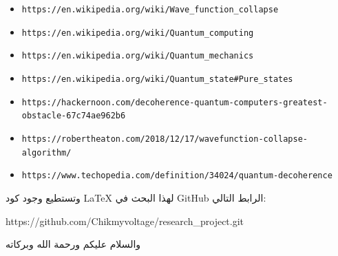 \documentclass[a4paper,12pt,openright,twoside]{book}
\begin{document}
\vspace*{0.5in}
\begin{itemize}
		\scriptsize
	\item \verb|https://en.wikipedia.org/wiki/Wave_function_collapse|
	\item \verb|https://en.wikipedia.org/wiki/Quantum_computing|
	\item \verb|https://en.wikipedia.org/wiki/Quantum_mechanics|
	\item \verb|https://en.wikipedia.org/wiki/Quantum_state#Pure_states|
	\item \verb|https://hackernoon.com/decoherence-quantum-computers-greatest-obstacle-67c74ae962b6|
	\item \verb|https://robertheaton.com/2018/12/17/wavefunction-collapse-algorithm/|
	\item \verb|https://www.techopedia.com/definition/34024/quantum-decoherence|
\end{itemize}


\vspace*{0.2in}

\small
وتستطيع وجود كود\hspace{1pt}
\LaTeX \hspace{1pt}
 لهذا البحث في GitHub الرابط التالي:

 \begin{center}
	 \normalsize
	 \vspace*{0.3in}
 https://github.com/Chikmyvoltage/research\_project.git
 \end{center}

\vspace*{0.7in}

\begin{center}
	\LARGE
	والسلام عليكم ورحمة الله وبركاته
\end{center}
\end{document}
